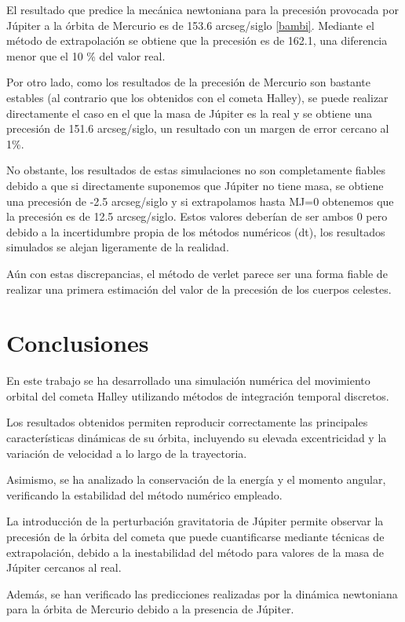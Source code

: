 \documentclass[11pt,a4paper]{article}
\begin{document}
El resultado que predice la mecánica newtoniana para la precesión provocada por Júpiter a la órbita de Mercurio es de 153.6 arcseg/siglo \ref{bambi}. Mediante el método de extrapolación se obtiene que la precesión es de 162.1, una diferencia menor que el 10 \% del valor real.

Por otro lado, como los resultados de la precesión de Mercurio son bastante estables (al contrario que los obtenidos con el cometa Halley), se puede realizar directamente el caso en el que la masa de Júpiter es la real y se obtiene una precesión de 151.6 arcseg/siglo, un resultado con un margen de error cercano al 1\%.

No obstante, los resultados de estas simulaciones no son completamente fiables debido a que si directamente suponemos que Júpiter no tiene masa, se obtiene una precesión de -2.5 arcseg/siglo y si extrapolamos hasta MJ=0 obtenemos que la precesión es de 12.5 arcseg/siglo. Estos valores deberían de ser ambos 0 pero debido a la incertidumbre propia de los métodos numéricos (dt), los resultados simulados se alejan ligeramente de la realidad.

Aún con estas discrepancias, el método de verlet parece ser una forma fiable de realizar una primera estimación del valor de la precesión de los cuerpos celestes.

\section{Conclusiones}

En este trabajo se ha desarrollado una simulación numérica del movimiento orbital del cometa Halley utilizando métodos de integración temporal discretos.

Los resultados obtenidos permiten reproducir correctamente las principales características dinámicas de su órbita, incluyendo su elevada excentricidad y la variación de velocidad a lo largo de la trayectoria.

Asimismo, se ha analizado la conservación de la energía y el momento angular, verificando la estabilidad del método numérico empleado.

La introducción de la perturbación gravitatoria de Júpiter permite observar la precesión de la órbita del cometa que puede cuantificarse mediante técnicas de extrapolación, debido a la inestabilidad del método para valores de la masa de Júpiter cercanos al real.

Además, se han verificado las predicciones realizadas por la dinámica newtoniana para la órbita de Mercurio debido a la presencia de Júpiter.
\end{document}
